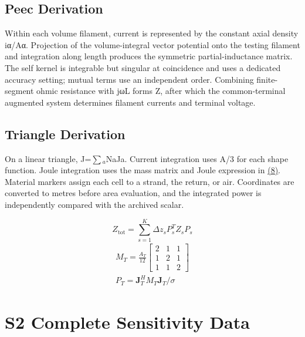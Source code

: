 \documentclass[11pt]{article}
\begin{document}
\subsection*{Peec Derivation}
\hypertarget{S1.peec_derivation.heading}{}
Within each volume filament, current is represented by the constant axial density iα/Aα. Projection of the volume-integral vector potential onto the testing filament and integration along length produces the symmetric partial-inductance matrix. The self kernel is integrable but singular at coincidence and uses a dedicated accuracy setting; mutual terms use an independent order. Combining finite-segment ohmic resistance with jωL forms Z, after which the common-terminal augmented system determines filament currents and terminal voltage.


\subsection*{Triangle Derivation}
\hypertarget{S1.triangle_derivation.heading}{}
On a linear triangle, J=\(\sum\)\(_a\)NaJa. Current integration uses A/3 for each shape function. Joule integration uses the mass matrix and Joule expression in \href{paper_en_single.pdf#E09}{(8)}. Material markers assign each cell to a strand, the return, or air. Coordinates are converted to metres before area evaluation, and the integrated power is independently compared with the archived scalar.


\hypertarget{E06}{}\begin{equation}Z_{\mathrm{tot}}=\sum_{s=1}^{K}\Delta z_s P_s^T Z_s P_s\tag{7}\label{eq:E06}\end{equation}
\hypertarget{E09}{}
\begin{equation}
\begin{gathered}
M_T=\frac{A_T}{12}\begin{bmatrix}2&1&1\\1&2&1\\1&1&2\end{bmatrix} \\
P_T=\mathbf J_T^H M_T\mathbf J_T/\sigma
\end{gathered}
\tag{8}\label{eq:E09}
\end{equation}
\FloatBarrier
\section*{S2 Complete Sensitivity Data}
\hypertarget{chapter-S2}{}
\end{document}
